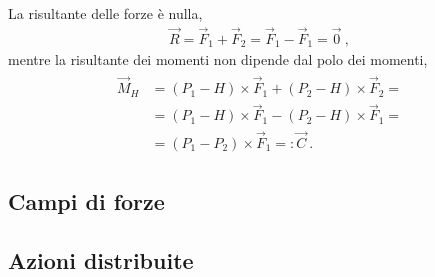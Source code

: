 \documentclass[letterpaper,10pt,italian]{jupyterBook}
\begin{document}
\sphinxAtStartPar
{} 

\sphinxAtStartPar
La risultante delle forze è nulla,
\begin{equation*}
\begin{split}\vec{R} = \vec{F}_1 + \vec{F}_2 = \vec{F}_1 - \vec{F}_1 = \vec{0} \ ,\end{split}
\end{equation*}
\sphinxAtStartPar
mentre la risultante dei momenti non dipende dal polo dei momenti,
\begin{equation*}
\begin{split}\begin{aligned}
  \vec{M}_H & = (P_1 - H) \times \vec{F}_1 + (P_2 - H) \times \vec{F}_2 = \\
  & = (P_1 - H) \times \vec{F}_1 - (P_2 - H) \times \vec{F}_1 = \\
  & = (P_1 - P_2) \times \vec{F}_1 =: \vec{C} \ .
\end{aligned}\end{split}
\end{equation*}

\subsection{Campi di forze}
\label{\detokenize{ch/mechanics/actions-types:campi-di-forze}}
\sphinxAtStartPar
{}


\subsection{Azioni distribuite}
\label{\detokenize{ch/mechanics/actions-types:azioni-distribuite}}
\sphinxAtStartPar
{}

\sphinxstepscope
\end{document}
